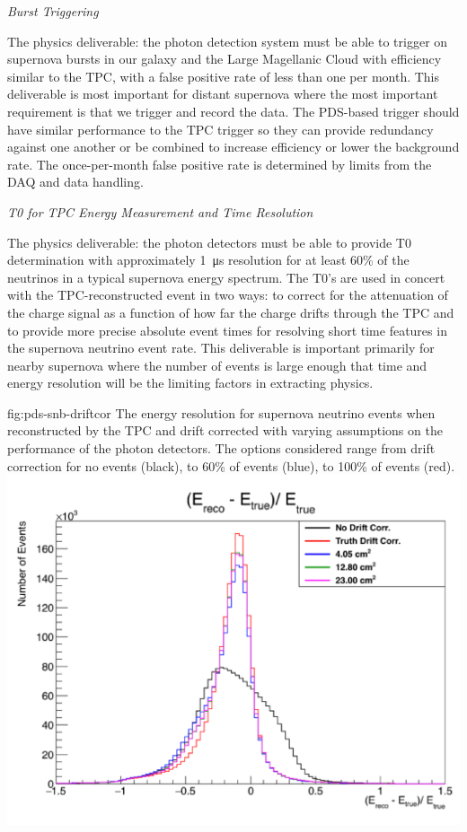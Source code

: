 \textit{\it Burst Triggering}

The physics deliverable: the photon detection system must be able to trigger on supernova bursts in our galaxy and the Large Magellanic Cloud with efficiency similar to the TPC, with a false positive rate of less than one per month. This deliverable is most important for distant supernova where the most important requirement is that we trigger and record the data. The PDS-based trigger should have similar performance to the TPC trigger so they can provide redundancy against one another or be combined to increase efficiency or lower the background rate. The once-per-month false positive rate is determined by limits from the DAQ and data handling.



\textit{\it T0 for TPC Energy Measurement and Time Resolution}

The physics deliverable: the photon detectors must be able to provide T0 determination with approximately \SI{1}{\micro s} resolution for at least 60\% of the neutrinos in a typical supernova energy spectrum. The T0's are used in concert with the TPC-reconstructed event in two ways: to correct for the attenuation of the charge signal as a function of how far the charge drifts through the TPC and to provide more precise absolute event times for resolving short time features in the supernova neutrino event rate. This deliverable is important primarily for nearby supernova where the number of events is large enough that time and energy resolution will be the limiting factors in extracting physics. 

\begin{dunefigure}
{fig:pds-snb-driftcor}
{The energy resolution for supernova neutrino events when reconstructed by the TPC and drift corrected with varying assumptions on the performance of the photon detectors. The options considered range from drift correction for no events (black), to 60\% of events (blue), to 100\% of events (red).}
  \includegraphics[width=0.4\columnwidth]{graphics/pd-snb-tpc-eres}
\end{dunefigure}

